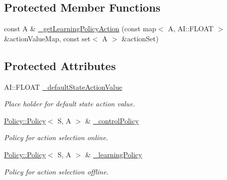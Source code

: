 \subsection*{Protected Member Functions}
\begin{DoxyCompactItemize}
\item 
const A \& \hyperlink{classAI_1_1Algorithm_1_1LearningAlgorithm_ad5b5f6baa9c03f68427008abeeb35535}{\-\_\-get\-Learning\-Policy\-Action} (const map$<$ A, A\-I\-::\-F\-L\-O\-A\-T $>$ \&action\-Value\-Map, const set$<$ A $>$ \&action\-Set)
\end{DoxyCompactItemize}
\subsection*{Protected Attributes}
\begin{DoxyCompactItemize}
\item 
\hypertarget{classAI_1_1Algorithm_1_1LearningAlgorithm_ae3b8ccdc51ad2a8c1cc2ef9009258466}{A\-I\-::\-F\-L\-O\-A\-T \hyperlink{classAI_1_1Algorithm_1_1LearningAlgorithm_ae3b8ccdc51ad2a8c1cc2ef9009258466}{\-\_\-default\-State\-Action\-Value}}\label{classAI_1_1Algorithm_1_1LearningAlgorithm_ae3b8ccdc51ad2a8c1cc2ef9009258466}

\begin{DoxyCompactList}\small\item\em Place holder for default state action value. \end{DoxyCompactList}\item 
\hypertarget{classAI_1_1Algorithm_1_1LearningAlgorithm_ad74dbed6a7be0c699d42642b9968bf86}{\hyperlink{classAI_1_1Algorithm_1_1Policy_1_1Policy}{Policy\-::\-Policy}$<$ S, A $>$ \& \hyperlink{classAI_1_1Algorithm_1_1LearningAlgorithm_ad74dbed6a7be0c699d42642b9968bf86}{\-\_\-control\-Policy}}\label{classAI_1_1Algorithm_1_1LearningAlgorithm_ad74dbed6a7be0c699d42642b9968bf86}

\begin{DoxyCompactList}\small\item\em Policy for action selection online. \end{DoxyCompactList}\item 
\hypertarget{classAI_1_1Algorithm_1_1LearningAlgorithm_a603f2a2905636a150c0fb9946085837a}{\hyperlink{classAI_1_1Algorithm_1_1Policy_1_1Policy}{Policy\-::\-Policy}$<$ S, A $>$ \& \hyperlink{classAI_1_1Algorithm_1_1LearningAlgorithm_a603f2a2905636a150c0fb9946085837a}{\-\_\-learning\-Policy}}\label{classAI_1_1Algorithm_1_1LearningAlgorithm_a603f2a2905636a150c0fb9946085837a}

\begin{DoxyCompactList}\small\item\em Policy for action selection offline. \end{DoxyCompactList}\end{DoxyCompactItemize}
